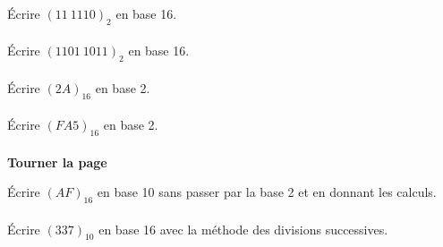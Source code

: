 \documentclass[a4paper,12pt,eval,firamath]{nsi}
\begin{document}
\maketitle

\'Ecrire $(11\ 1110)_2$ en base 16.\\

\\

\'Ecrire $(1101\ 1011)_2$ en base 16.\\

\\

\'Ecrire $(2A)_{16}$ en base 2.\\

\\

\'Ecrire $(FA5)_{16}$ en base 2.\\

\\

{\hfill\textbf{Tourner la page}}

\newpage

\'Ecrire $(AF)_{16}$ en base 10 sans passer par la base 2 et en donnant les calculs.\\

\\

\'Ecrire $(337)_{10}$ en base 16 avec la méthode des divisions successives.\\

\end{document}
